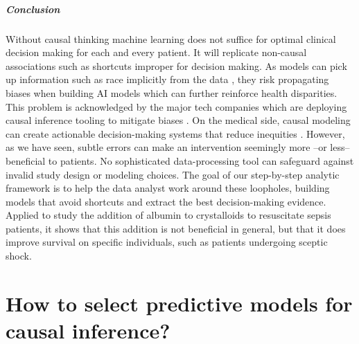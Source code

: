 \documentclass[french,12pt,twoside,a4paper]{book}
\begin{document}
\paragraph{Conclusion}

Without causal thinking machine learning does not suffice for optimal
clinical decision making for each and every patient. It will replicate
non-causal associations such as shortcuts improper for decision making.
As models can pick up information such as race implicitly from the data
\citep{adam2022write}, they risk propagating biases when building AI
models which can further reinforce health disparities. This problem is
acknowledged by the major tech companies which are deploying
causal inference tooling to mitigate biases
\citep{tensorflow_responsible_ai, microsoft_responsible_ai, pwc_responsible_ai}.
%
On the medical side, causal modeling can create actionable
decision-making systems that reduce inequities
\citep{mitra2022future,ehrmann2023making}.
%
However, as we have seen, subtle errors can make an intervention seemingly more
--or less-- beneficial to patients. No sophisticated data-processing
tool can safeguard against invalid study design or modeling choices.
%
The goal of our step-by-step analytic framework is to help the data
analyst work around these loopholes, building models that avoid shortcuts
and extract the best decision-making evidence.
%
Applied to study the addition of albumin to crystalloids to
resuscitate sepsis patients, it shows that this addition is not
beneficial in general, but that it does improve survival on
specific individuals, such as patients undergoing sceptic shock.




\chapter{How to select predictive models for causal inference?}%
\label{chapter:causal_model_selection}%
\end{document}
